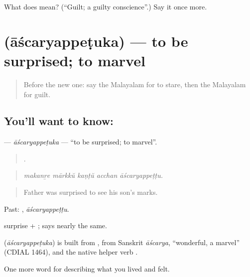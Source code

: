 \begin{tcolorbox}[breakable,colback=teal!4,colframe=teal!35!black,title={Before you move on}]
What does  mean? (\textquotedblleft{}Guilt; a guilty conscience\textquotedblright{}.) Say it once more.
\end{tcolorbox}
\section[\texorpdfstring{\ml{ആശ്ചര്യപ്പെടുക} (āścaryappeṭuka)}{ആശ്ചര്യപ്പെടുക (āścaryappeṭuka)}]{ (āścaryappeṭuka) — to be surprised; to marvel}

\label{lesson:ML-C524-ascaryappetuka}



\begin{quote}
Before the new one: say the Malayalam for to stare, then the Malayalam for guilt.
\end{quote}

\subsection*{You'll want to know: }
\textbf{} — \emph{āścaryappeṭuka} — \textquotedblleft{}to be surprised; to marvel\textquotedblright{}.

\begin{quote}
    .
\end{quote}

\begin{quote}
\emph{makanṟe mārkkŭ kaṇṭŭ acchan āścaryappeṭṭu.}
\end{quote}

\begin{quote}
Father was surprised to see his son's marks.
\end{quote}

Past: , \emph{āścaryappeṭṭu}.

 surprise + ;  says nearly the same.

\begin{cousinweb}
\textbf{} (\emph{āścaryappeṭuka}) is built from , from Sanskrit \emph{āścarya}, \textquotedblleft{}wonderful, a marvel\textquotedblright{} (CDIAL 1464), and the native helper verb .
\end{cousinweb}

\begin{grammarlens}[title={What you've built}]
One more word for describing what you lived and felt.
\end{grammarlens}

